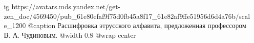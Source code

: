  
 
 
 
 

\ifcmt
  ig https://avatars.mds.yandex.net/get-zen_doc/4569450/pub_61e80efaf9f75d0fb45a8f17_61e82af9ffe51956d6d4a76b/scale_1200
  @caption Расшифровка этрусского алфавита, предложенная профессором В. А. Чудиновым.
  @width 0.8
  @wrap center
\fi

